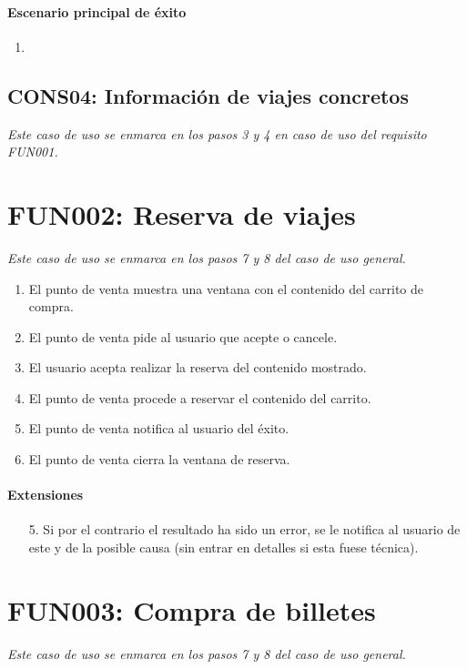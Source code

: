     \paragraph{Escenario principal de éxito}
    \begin{enumerate}
      \item 
    \end{enumerate}

  \subsection{CONS04: Información de viajes concretos}
    \emph{Este caso de uso se enmarca en los pasos 3 y 4 en caso de uso del requisito FUN001.}

\section{FUN002: Reserva de viajes}
  \emph{Este caso de uso se enmarca en los pasos 7 y 8 del caso de uso general.}
  \begin{enumerate}
    \item El punto de venta muestra una ventana con el contenido del carrito de compra.
    \item El punto de venta pide al usuario que acepte o cancele.
    \item El usuario acepta realizar la reserva del contenido mostrado.
    \item El punto de venta procede a reservar el contenido del carrito.
    \item El punto de venta notifica al usuario del éxito.
    \item El punto de venta cierra la ventana de reserva.
  \end{enumerate}
  \paragraph{Extensiones}
  \begin{enumerate}
    \item[5.] Si por el contrario el resultado ha sido un error, se le notifica al usuario de este y de la posible causa (sin entrar en detalles si esta fuese técnica).
  \end{enumerate}



\section{FUN003: Compra de billetes}
  \emph{Este caso de uso se enmarca en los pasos 7 y 8 del caso de uso general.}

